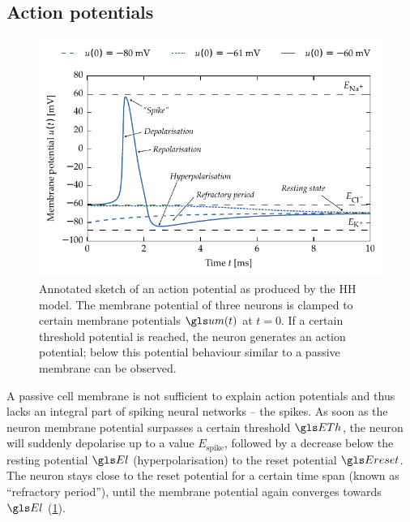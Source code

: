 \subsection{Action potentials}

\begin{figure}
	\small
	\centering
	\includegraphics{media/chp2/hh_ap2_annotated.pdf}
	\caption[Annotated sketch of an action potential]{Annotated sketch of an action potential as produced by the \acrfull{HH} model. The membrane potential of three neurons is clamped to certain membrane potentials $\um(t)$ at $t = 0$. If a certain threshold potential is reached, the neuron generates an action potential; below this potential behaviour similar to a passive membrane can be observed.}
	\label{fig:action_potential_sketch}
\end{figure}

A passive cell membrane is not sufficient to explain action potentials and thus lacks an integral part of spiking neural networks -- the spikes. As soon as the neuron membrane potential surpasses a certain threshold $\ETh$, the neuron will suddenly depolarise up to a value $E_{\mathrm{spike}}$, followed by a decrease below the resting potential $\El$ (hyperpolarisation) to the reset potential $\Ereset$. The neuron stays close to the reset potential for a certain time span (known as \enquote{refractory period}), until the membrane potential again converges towards $\El$ (\cref{fig:action_potential_sketch}).

